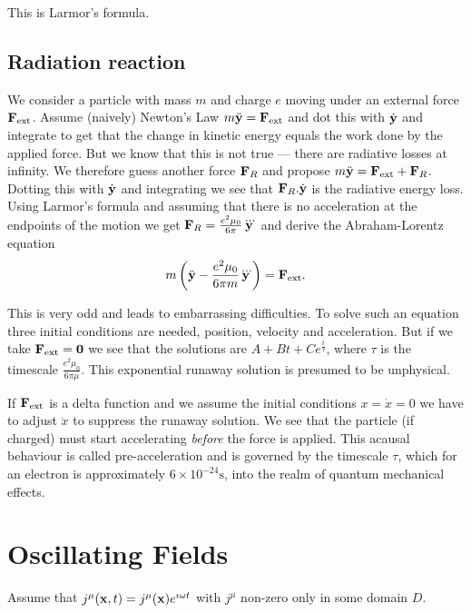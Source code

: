 \documentclass{notes}
\begin{document}
This is Larmor's formula.

\subsection{Radiation reaction}

We consider a particle with mass $m$ and charge $e$ moving under an
external force $\mathbf{F}_{\text{ext}}$.  Assume (naively) Newton's Law
$m \ddot{\mathbf{y}} = \mathbf{F}_{\text{ext}}$ and dot this with
$\dot{\mathbf{y}}$ and integrate to get that the change in kinetic
energy equals the work done by the applied force.  But we know that
this is not true --- there are radiative losses at infinity.  We
therefore guess another force $\mathbf{F}_R$ and propose $m
\ddot{\mathbf{y}} = \mathbf{F}_{\text{ext}} + \mathbf{F}_R$.  Dotting this
with $\dot{\mathbf{y}}$ and integrating we see that $\mathbf{F}_R.\dot{\mathbf{y}}
$ is the radiative energy loss.  Using Larmor's formula and assuming
that there is no acceleration at the endpoints of the motion we get
$\mathbf{F}_R = \frac{e^2 \mu_0}{6 \pi} \dddot{\mathbf{y}}$ and derive the
Abraham-Lorentz equation
\[
m\left(\ddot{\mathbf{y}} - \frac{e^2 \mu_0}{6 \pi m} \dddot{\mathbf{y}} \right)
= \mathbf{F}_{\text{ext}}.
\]

This is very odd and leads to embarrassing difficulties.  To solve such
an equation three initial conditions are needed, position, velocity and
acceleration.  But if we take $\mathbf{F}_{\text{ext}} = \mathbf{0}$ we
see that the solutions are $A + B t + Ce^{\frac{t}{\tau}}$, where
$\tau$ is the timescale $\frac{e^2 \mu_0}{6 \pi \mu}$.  This exponential
runaway solution is presumed to be unphysical.

If $\mathbf{F}_{\text{ext}}$ is a delta function and we assume the
initial conditions $x = \dot{x} = 0$ we have to adjust $\ddot{x}$ to
suppress the runaway solution.  We see that the particle (if charged)
must start accelerating \emph{before} the force is applied.  This
acausal behaviour is called pre-acceleration and is governed by the
timescale $\tau$, which for an electron is approximately $6 \times
10^{-24} \mathrm{s}$, into the realm of quantum mechanical effects.

\section{Oscillating Fields}

Assume that $j^\mu(\mathbf{x},t) = j^\mu(\mathbf{x}) e^{\imath \omega t}$ with
$j^\mu$ non-zero only in some domain $D$.
\end{document}
